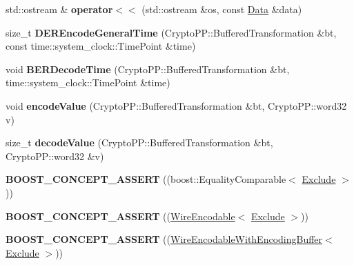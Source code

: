 \begin{DoxyCompactItemize}
\item 
std\+::ostream \& {\bfseries operator$<$$<$} (std\+::ostream \&os, const \hyperlink{classndn_1_1Data}{Data} \&data)\hypertarget{namespacendn_a8e6fd0de4da9047172d301cfe05fa03d}{}\label{namespacendn_a8e6fd0de4da9047172d301cfe05fa03d}

\item 
size\+\_\+t {\bfseries D\+E\+R\+Encode\+General\+Time} (Crypto\+P\+P\+::\+Buffered\+Transformation \&bt, const time\+::system\+\_\+clock\+::\+Time\+Point \&time)\hypertarget{namespacendn_aae4e7a928db2b2f78a8c811830ce8faf}{}\label{namespacendn_aae4e7a928db2b2f78a8c811830ce8faf}

\item 
void {\bfseries B\+E\+R\+Decode\+Time} (Crypto\+P\+P\+::\+Buffered\+Transformation \&bt, time\+::system\+\_\+clock\+::\+Time\+Point \&time)\hypertarget{namespacendn_af09ca71fbadd73835b805de38cd6cad9}{}\label{namespacendn_af09ca71fbadd73835b805de38cd6cad9}

\item 
void {\bfseries encode\+Value} (Crypto\+P\+P\+::\+Buffered\+Transformation \&bt, Crypto\+P\+P\+::word32 v)\hypertarget{namespacendn_a9ce3442c1393f7819a0fb2c79ef65446}{}\label{namespacendn_a9ce3442c1393f7819a0fb2c79ef65446}

\item 
size\+\_\+t {\bfseries decode\+Value} (Crypto\+P\+P\+::\+Buffered\+Transformation \&bt, Crypto\+P\+P\+::word32 \&v)\hypertarget{namespacendn_ac9c033067ff176ccadd088c9034b7cb9}{}\label{namespacendn_ac9c033067ff176ccadd088c9034b7cb9}

\item 
{\bfseries B\+O\+O\+S\+T\+\_\+\+C\+O\+N\+C\+E\+P\+T\+\_\+\+A\+S\+S\+E\+RT} ((boost\+::\+Equality\+Comparable$<$ \hyperlink{classndn_1_1Exclude}{Exclude} $>$))\hypertarget{namespacendn_a5b5b049e2affdca4cbfe48c3865a01c8}{}\label{namespacendn_a5b5b049e2affdca4cbfe48c3865a01c8}

\item 
{\bfseries B\+O\+O\+S\+T\+\_\+\+C\+O\+N\+C\+E\+P\+T\+\_\+\+A\+S\+S\+E\+RT} ((\hyperlink{classndn_1_1WireEncodable}{Wire\+Encodable}$<$ \hyperlink{classndn_1_1Exclude}{Exclude} $>$))\hypertarget{namespacendn_a64d6c13b909884c5a5094bf365a34d61}{}\label{namespacendn_a64d6c13b909884c5a5094bf365a34d61}

\item 
{\bfseries B\+O\+O\+S\+T\+\_\+\+C\+O\+N\+C\+E\+P\+T\+\_\+\+A\+S\+S\+E\+RT} ((\hyperlink{classndn_1_1WireEncodableWithEncodingBuffer}{Wire\+Encodable\+With\+Encoding\+Buffer}$<$ \hyperlink{classndn_1_1Exclude}{Exclude} $>$))\hypertarget{namespacendn_a7607801f161efb98d137f6700b602105}{}\label{namespacendn_a7607801f161efb98d137f6700b602105}


\end{DoxyCompactItemize}
